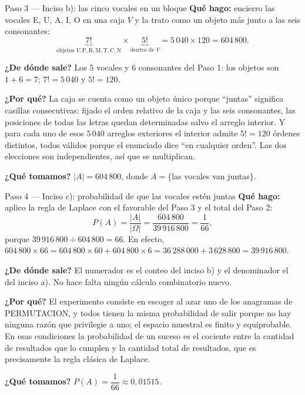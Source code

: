\documentclass[11pt]{article}
\begin{document}
\begin{paso}{Paso 3 --- Inciso b): las cinco vocales en un bloque}
\textbf{Qué hago:} encierro las vocales E, U, A, I, O en una caja $V$ y la trato como un objeto más junto
a las seis consonantes:
\[
\underbrace{7!}_{\text{objetos } V,\text{P},\text{R},\text{M},\text{T},\text{C},\text{N}}\times
\underbrace{5!}_{\text{dentro de }V}=5\,040\times120=604\,800 .
\]

\textbf{¿De dónde sale?} Los $5$ vocales y $6$ consonantes del Paso 1: los objetos son
$1+6=7$; $7!=5\,040$ y $5!=120$.

\textbf{¿Por qué?} La caja se cuenta como un objeto único porque ``juntas'' significa casillas
consecutivas: fijado el orden relativo de la caja y las seis consonantes, las posiciones de todas las
letras quedan determinadas salvo el arreglo interior. Y para cada uno de esos $5\,040$ arreglos exteriores
el interior admite $5!=120$ órdenes distintos, todos válidos porque el enunciado dice ``en cualquier
orden''. Las dos elecciones son independientes, así que se multiplican.

\textbf{¿Qué tomamos?} $|A|=604\,800$, donde $A=\{$las vocales van juntas$\}$.
\end{paso}

\begin{paso}{Paso 4 --- Inciso c): probabilidad de que las vocales estén juntas}
\textbf{Qué hago:} aplico la regla de Laplace con el favorable del Paso 3 y el total del Paso 2:
\[
P(A)=\frac{|A|}{|\Omega|}=\frac{604\,800}{39\,916\,800}=\frac{1}{66} ,
\]
porque $39\,916\,800\div 604\,800=66$. En efecto, $604\,800\times66=604\,800\times60+604\,800\times6
=36\,288\,000+3\,628\,800=39\,916\,800$.

\textbf{¿De dónde sale?} El numerador es el conteo del inciso b) y el denominador el del inciso a). No hace
falta ningún cálculo combinatorio nuevo.

\textbf{¿Por qué?} El experimento consiste en escoger al azar uno de los anagramas de PERMUTACION, y todos
tienen la misma probabilidad de salir porque no hay ninguna razón que privilegie a uno; el espacio muestral
es finito y equiprobable. En esas condiciones la probabilidad de un suceso es el cociente entre la cantidad
de resultados que lo cumplen y la cantidad total de resultados, que es precisamente la regla clásica de
Laplace.

\textbf{¿Qué tomamos?} $P(A)=\dfrac{1}{66}\approx0{,}01515$.
\end{paso}
\end{document}
